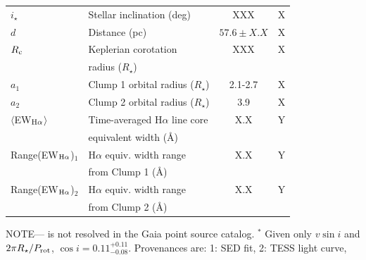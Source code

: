 \documentclass{nature3}
\begin{document}
\begin{table}
\begin{tabular}{llcc}
%
$i_\star$\dotfill                       & Stellar inclination (deg)\dotfill                              & 	XXX             & X \\
%
$d$\dotfill                             & Distance (pc)\dotfill                                          & $57.6 \pm X.X$   & X \\
%
$R_{\rm c}$\dotfill		                  & Keplerian corotation\dotfill                                   &  XXX             & X \\
                                        & \hspace{3pt} radius ($R_\star$)	                               &                      \\
%
$a_1$\dotfill                           & Clump 1 orbital radius ($R_\star$)\hspace{9pt}\dotfill         &  2.1-2.7         & X \\
$a_2$\dotfill                           & Clump 2 orbital radius ($R_\star$)\hspace{9pt}\dotfill         &  3.9             & X \\
%
$\langle$EW$_{\rm H\alpha}$$\rangle$    & Time-averaged H$\alpha$ line core                              &  X.X             & Y \\ 
                                        & \hspace{3pt} equivalent width (\AA)	                           &                      \\
Range(EW$_{\rm H\alpha}$)$_1$           & H$\alpha$ equiv. width range                                   &  X.X             & Y \\ 
                                        & \hspace{3pt} from Clump 1 (\AA)	                               &                      \\
Range(EW$_{\rm H\alpha}$)$_2$           & H$\alpha$ equiv. width range                                   &  X.X             & Y \\ 
                                        & \hspace{3pt} from Clump 2 (\AA)	                               &                      \\
\hline
\end{tabular}
\begin{flushleft}
\footnotesize{ \textsc{NOTE}---
is not resolved in the Gaia point source catalog.
$^*$ Given only $v\sin i$ and $2\pi R_\star/P_{\rm rot}$, $\cos i=0.11^{+0.11}_{-0.08}$.
Provenances are:
1: SED fit\cite{Bouma2024},
2: TESS light curve,
}
\end{flushleft}
\vspace{-0.5cm}
\end{table}
\end{document}
